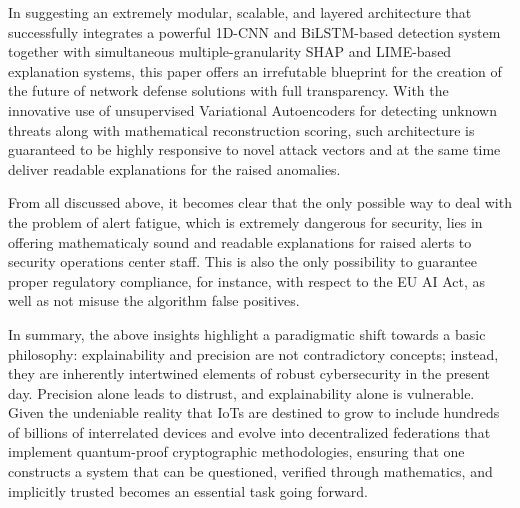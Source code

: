 \documentclass[12pt]{article}
\begin{document}
    In suggesting an extremely modular, scalable, and layered architecture that successfully integrates a powerful 1D-CNN and BiLSTM-based detection system together with simultaneous multiple-granularity SHAP and LIME-based explanation systems, this paper offers an irrefutable blueprint for the creation of the future of network defense solutions with full transparency. With the innovative use of unsupervised Variational Autoencoders for detecting unknown threats along with mathematical reconstruction scoring, such architecture is guaranteed to be highly responsive to novel attack vectors and at the same time deliver readable explanations for the raised anomalies.
        
        From all discussed above, it becomes clear that the only possible way to deal with the problem of alert fatigue, which is extremely dangerous for security, lies in offering mathematicaly sound and readable explanations for raised alerts to security operations center staff. This is also the only possibility to guarantee proper regulatory compliance, for instance, with respect to the EU AI Act, as well as not misuse the algorithm false positives.

    In summary, the above insights highlight a paradigmatic shift towards a basic philosophy: explainability and precision are not contradictory concepts; instead, they are inherently intertwined elements of robust cybersecurity in the present day. Precision alone leads to distrust, and explainability alone is vulnerable. Given the undeniable reality that IoTs are destined to grow to include hundreds of billions of interrelated devices and evolve into decentralized federations that implement quantum-proof cryptographic methodologies, ensuring that one constructs a system that can be questioned, verified through mathematics, and implicitly trusted becomes an essential task going forward.

    \newpage
    
    
\end{document}
